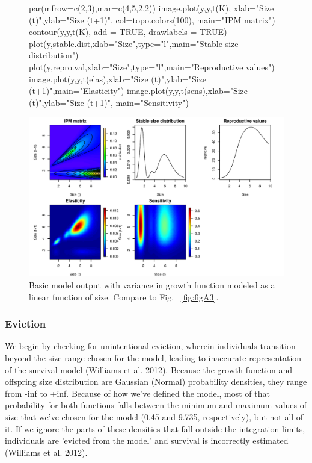 \documentclass[11pt]{article}
\begin{document}
\begin{enumerate}[(A)]
\begin{figure}[H]
\begin{center}
\begin{Schunk}
\begin{Sinput}
     par(mfrow=c(2,3),mar=c(4,5,2,2)) 
     image.plot(y,y,t(K), xlab="Size (t)",ylab="Size (t+1)",
        col=topo.colors(100), main="IPM matrix")
     contour(y,y,t(K), add = TRUE, drawlabels = TRUE)
     plot(y,stable.dist,xlab="Size",type="l",main="Stable size distribution")
     plot(y,repro.val,xlab="Size",type="l",main="Reproductive values") 
     image.plot(y,y,t(elas),xlab="Size (t)",ylab="Size (t+1)",main="Elasticity")
     image.plot(y,y,t(sens),xlab="Size (t)",ylab="Size (t+1)", main="Sensitivity")
\end{Sinput}
\end{Schunk}
\includegraphics{IPM_Guide_Appendix_A-fig5}
\caption{Basic model output with variance in growth function modeled as a linear function of size. Compare to Fig. ~\ref{fig:figA3}.}
\label{fig:figA5}
\end{center}
\end{figure}


\end{enumerate}

\subsubsection{Eviction}
\label{sec:Eviction}
We begin by checking for unintentional eviction, wherein individuals transition beyond the size range chosen for the model, leading to inaccurate representation of the survival model (Williams et al. 2012). Because the growth function and offspring size distribution are Gaussian (Normal) probability densities, they range from -inf to +inf. Because of how we've defined the model, most of that probability for both functions falls between the minimum and maximum values of size that we've chosen for the model (0.45 and 9.735, respectively), but not all of it. If we ignore the parts of these densities that fall outside the integration limits, individuals are 'evicted from the model' and survival is incorrectly estimated (Williams et al. 2012). 
\end{document}
